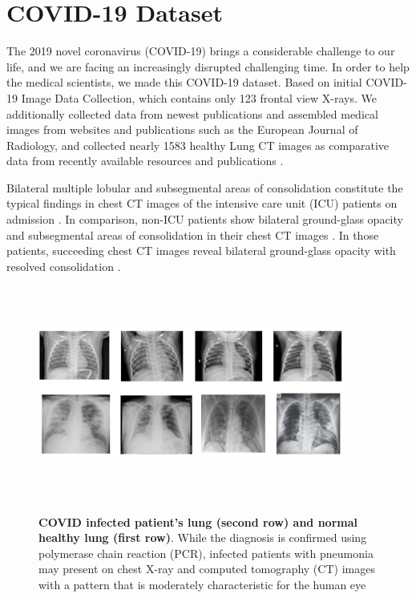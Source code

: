 \section{COVID-19 Dataset} %
\label{sub:amet}

The 2019 novel coronavirus (COVID-19) brings a considerable challenge to our life, and we are facing an increasingly disrupted challenging time. In order to help the medical scientists, we made this COVID-19 dataset. Based on initial COVID-19 Image Data Collection\cite{37}, which contains only 123 frontal view X-rays. We additionally collected data from newest publications and assembled medical images from websites and publications such as the European Journal of Radiology\cite{36}, and collected nearly 1583 healthy Lung CT images as comparative data from recently available resources and publications\cite{37} \cite{38}.


Bilateral multiple lobular and subsegmental areas of consolidation constitute the typical findings in chest CT images of the intensive care unit (ICU) patients on admission \cite{huang}. In comparison, non-ICU patients show bilateral ground-glass opacity and subsegmental areas of consolidation in their chest CT images \cite{huang}. In those patients, succeeding chest CT images reveal bilateral ground-glass opacity with resolved consolidation \cite{huang}.

\begin{figure}[t]
\begin{center}
\includegraphics[height=200pt,width=0.9\textwidth]{thesis-template-master/images/covidlungandhealthylung.JPG}
\label{fig:cellnet}
\end{center}
\caption{\textbf{COVID infected patient’s lung (second row) and normal healthy lung (first row)\cite{huang}}. While the diagnosis is confirmed using polymerase chain reaction (PCR), infected patients with pneumonia may present on chest X-ray and computed tomography (CT) images with a pattern that is moderately characteristic for the human eye\cite{huang}}
\label{fig:4.15}
\end{figure}


